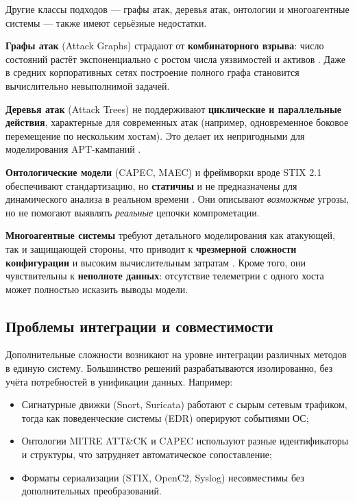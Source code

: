 \documentclass{article}
\begin{document}
Другие классы подходов — графы атак, деревья атак, онтологии и многоагентные системы — также имеют серьёзные недостатки.

\textbf{Графы атак} (Attack Graphs) страдают от \textbf{комбинаторного взрыва}: число состояний растёт экспоненциально с ростом числа уязвимостей и активов \cite{Sheyner2002}. Даже в средних корпоративных сетях построение полного графа становится вычислительно невыполнимой задачей.

\textbf{Деревья атак} (Attack Trees) не поддерживают \textbf{циклические и параллельные действия}, характерные для современных атак (например, одновременное боковое перемещение по нескольким хостам). Это делает их непригодными для моделирования APT-кампаний \cite{Lallie2019}.

\textbf{Онтологические модели} (CAPEC, MAEC) и фреймворки вроде STIX 2.1 обеспечивают стандартизацию, но \textbf{статичны} и не предназначены для динамического анализа в реальном времени \cite{Gorbachev2018}. Они описывают \textit{возможные} угрозы, но не помогают выявлять \textit{реальные} цепочки компрометации.

\textbf{Многоагентные системы} требуют детального моделирования как атакующей, так и защищающей стороны, что приводит к \textbf{чрезмерной сложности конфигурации} и высоким вычислительным затратам \cite{Zegzhda2016}. Кроме того, они чувствительны к \textbf{неполноте данных}: отсутствие телеметрии с одного хоста может полностью исказить выводы модели.

\subsection{Проблемы интеграции и совместимости}

Дополнительные сложности возникают на уровне интеграции различных методов в единую систему. Большинство решений разрабатываются изолированно, без учёта потребностей в унификации данных. Например:

\begin{itemize}
    \item Сигнатурные движки (Snort, Suricata) работают с сырым сетевым трафиком, тогда как поведенческие системы (EDR) оперируют событиями ОС;
    \item Онтологии MITRE ATT\&CK и CAPEC используют разные идентификаторы и структуры, что затрудняет автоматическое сопоставление;
    \item Форматы сериализации (STIX, OpenC2, Syslog) несовместимы без дополнительных преобразований.
\end{itemize}
\end{document}
